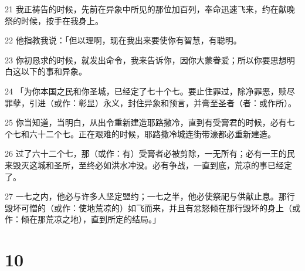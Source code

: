 \par 21 我正祷告的时候，先前在异象中所见的那位加百列，奉命迅速飞来，约在献晚祭的时候，按手在我身上。
\par 22 他指教我说：「但以理啊，现在我出来要使你有智慧，有聪明。
\par 23 你初恳求的时候，就发出命令，我来告诉你，因你大蒙眷爱；所以你要思想明白这以下的事和异象。
\par 24 「为你本国之民和你圣城，已经定了七十个七。要止住罪过，除净罪恶，赎尽罪孽，引进（或作：彰显）永义，封住异象和预言，并膏至圣者（者：或作所）。
\par 25 你当知道，当明白，从出令重新建造耶路撒冷，直到有受膏君的时候，必有七个七和六十二个七。正在艰难的时候，耶路撒冷城连街带濠都必重新建造。
\par 26 过了六十二个七，那（或作：有）受膏者必被剪除，一无所有；必有一王的民来毁灭这城和圣所，至终必如洪水冲没。必有争战，一直到底，荒凉的事已经定了。
\par 27 一七之内，他必与许多人坚定盟约；一七之半，他必使祭祀与供献止息。那行毁坏可憎的（或作：使地荒凉的）如飞而来，并且有忿怒倾在那行毁坏的身上（或作：倾在那荒凉之地），直到所定的结局。」

\chapter{10}

